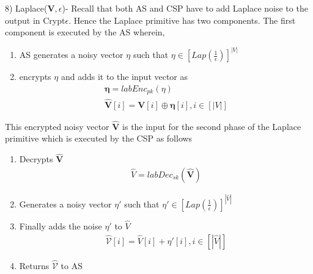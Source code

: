 8) \textsf{Laplace}($\mathbf{V},\epsilon$)- Recall that both \textsf{AS} and \textsf{CSP} have to add Laplace noise to the output in Crypt$\epsilon$. Hence the \textsf{Laplace} primitive has two components. The first component is executed by the \textsf{AS} wherein,
\begin{enumerate} \item \textsf{AS} generates a noisy vector $\eta$ such that $\eta \in [Lap(\frac{1}{\epsilon})]^{|V|}$ \item encrypts $\eta$ and adds it to the input vector as \begin{gather*}\boldsymbol{\eta}=labEnc_{pk}(\eta)\\\mathbf{\hat{V}}[i]=\mathbf{V}[i]\oplus \boldsymbol{\eta}[i], i \in [|V|]\end{gather*} \end{enumerate} This encrypted noisy vector $\mathbf{\hat{V}}$ is the input for the second phase of the \textsf{Laplace} primitive which is executed by the \textsf{CSP} as follows \begin{enumerate}\item Decrypts $\mathbf{\hat{V}}$ \begin{gather*}\hat{V}=labDec_{sk}(\mathbf{\hat{V}})\end{gather*}  \item Generates a noisy vector $\eta'$ such that $\eta' \in [Lap(\frac{1}{\epsilon})]^{|\hat{V}|}$ \item Finally adds the noise $\eta'$ to $\hat{V}$ \begin{gather*}\hat{\mathcal{V}}[i]=\hat{V}[i]+\eta'[i], i \in [|\hat{V}|]\end{gather*} \item Returns $\hat{\mathcal{V}}$ to \textsf{AS} \end{enumerate} 

